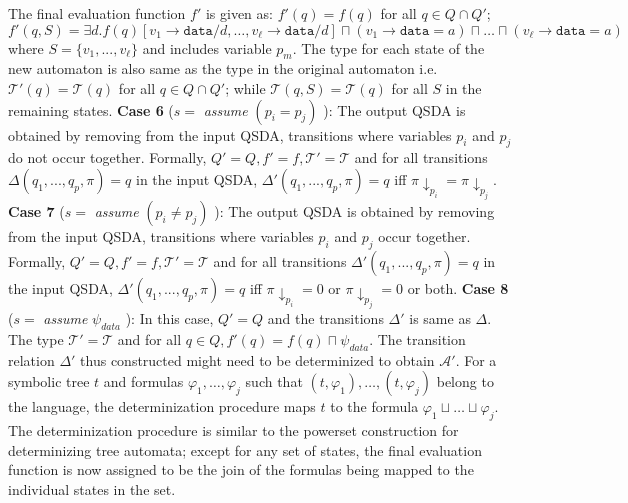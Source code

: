\documentclass{llncs}
\newcommand{\data}{\texttt{data}}
\begin{document}
The final evaluation function $f'$ is given as: $f'(q) = f(q)$ for all $q \in Q \cap Q'$; $f'(q, S) = \exists d. f(q)[v_1\rightarrow\data/d, \ldots, v_\ell\rightarrow\data/d] \sqcap (v_1\rightarrow\data = a) \sqcap \ldots \sqcap (v_\ell\rightarrow\data = a)$ where $S = \{v_1, ..., v_\ell\}$ and includes variable $p_m$. The type for each state of the new automaton is also same as the type in the original automaton i.e. $\mathcal{T'}(q) = \mathcal{T}(q)$ for all $q \in Q \cap Q'$; while $\mathcal{T}(q, S) = \mathcal{T}(q)$ for all $S$ in the remaining states.
\newline\newline
{\bf Case 6} ($s =$ \emph{assume} $(p_i = p_j)$ ): 
The output QSDA is obtained by removing from the input QSDA, transitions where variables $p_i$ and $p_j$ do not occur together. Formally, $Q' = Q, f' = f, \mathcal{T'} = \mathcal{T}$ and for all transitions $\Delta(q_1, ..., q_p, \pi) = q$ in the input QSDA, $\Delta'(q_1, ..., q_p, \pi) = q$ iff $\pi \downarrow_{p_i} = \pi \downarrow_{p_j}$. 
\newline\newline
{\bf Case 7} ($s =$ \emph{assume} $(p_i \neq p_j)$ ): 
The output QSDA is obtained by removing from the input QSDA, transitions where variables $p_i$ and $p_j$  occur together. Formally, $Q' = Q, f' = f, \mathcal{T'} = \mathcal{T}$ and for all transitions $\Delta'(q_1, ..., q_p, \pi) =  q$ in the input QSDA, $\Delta'(q_1, ..., q_p, \pi) = q$ iff $\pi \downarrow_{p_i} = 0$ or $\pi \downarrow_{p_j} = 0$ or both. 
\newline\newline
{\bf Case 8} ($s = $ \emph{assume} $\psi_{data}$ ): 
In this case, $Q' = Q$ and the transitions $\Delta'$ is same as $\Delta$.
The type 
$\mathcal{T'} = \mathcal{T}$ and for all $q \in Q, f'(q) = f(q) \sqcap \psi_{data}$.
\newline\newline
\noindent The transition relation $\Delta'$ thus constructed might need to be determinized to obtain $\mathcal{A'}$. 
For a symbolic tree $t$ and formulas $\varphi_1, \ldots, \varphi_j$ such that $(t, \varphi_1), \ldots, (t, \varphi_j)$ belong to the language, the determinization procedure maps $t$ to the formula $\varphi_1 \sqcup \ldots \sqcup \varphi_j$. The determinization procedure is similar to the powerset construction for determinizing tree automata; except for any set of states, the final evaluation function is now assigned to be the join of the formulas being mapped to the individual states in the set.





 
\end{document}
